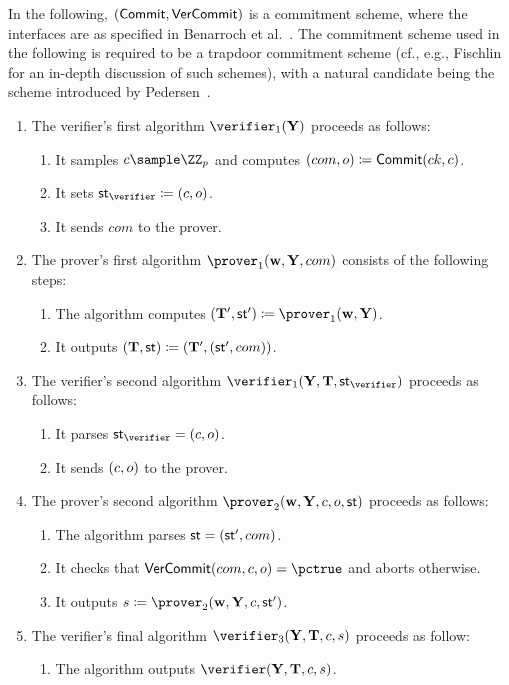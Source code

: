 \documentclass[runningheads]{llncs}
\begin{document}
In the following, $({\sf Commit}, {\sf VerCommit})$ is a commitment scheme, where the interfaces are as specified in Benarroch et al.~\cite[Section 4.3]{becafi19}.
The commitment scheme used in the following is required to be a trapdoor commitment scheme (cf., e.g., Fischlin~\cite{fischlin01} for an in-depth discussion of such schemes), with a natural candidate being the scheme introduced by Pedersen~\cite{C:Pedersen91}.
\begin{enumerate}
  \item
    The verifier's first algorithm $\verifier_1(\vec \statement)$ proceeds as follows:
    \begin{enumerate}
      \item
	It samples $\challenge\sample\ZZ_p$ and computes $(com,o)\coloneqq{\sf Commit}(ck,c)$.
      \item
        It sets $\st_\verifier\defeq(\challenge,o)$.
      \item
        It sends $com$ to the prover.
    \end{enumerate}
  \item
    The prover's first algorithm $\prover_1(\vec \witness,\vec \statement,com)$ consists of the following steps:
    \begin{enumerate}
      \item
	The algorithm computes $(\vec \commitment',\st') \defeq \prover_1(\vec \witness,\vec \statement)$.
      \item
	It outputs $(\mathbf {T},\mathsf{st}) \coloneqq (\mathbf {T}',(\mathsf{st}',com))$.
    \end{enumerate}
  \item
    The verifier's second algorithm $\verifier_1(\vec \statement,\vec \commitment,\st_\verifier)$ proceeds as follows:
    \begin{enumerate}
      \item
        It parses $\st_\verifier=(\challenge,o)$.
      \item
        It sends $(c,o)$ to the prover.
    \end{enumerate}
  \item
    The prover's second algorithm $\prover_2(\vec \witness,\vec \statement,\challenge,o,\st)$ proceeds as follows:
    \begin{enumerate}
      \item
        The algorithm parses $\mathsf{st}=(\mathsf{st}',com)$.
      \item
        It checks that ${\sf VerCommit}(com,\challenge,o)=\accept$ and aborts otherwise.
      \item
        It outputs $s\defeq\prover_2(\vec \witness, \vec \statement,\challenge,\st')$.
    \end{enumerate}
  \item
    The verifier's final algorithm $\verifier_3(\vec \statement,\vec \commitment,\challenge,\response)$ proceeds as follow:
    \begin{enumerate}
      \item
	The algorithm outputs $\verifier(\vec \statement,\vec \commitment,\challenge,\response)$.
    \end{enumerate}
\end{enumerate}
\end{document}
